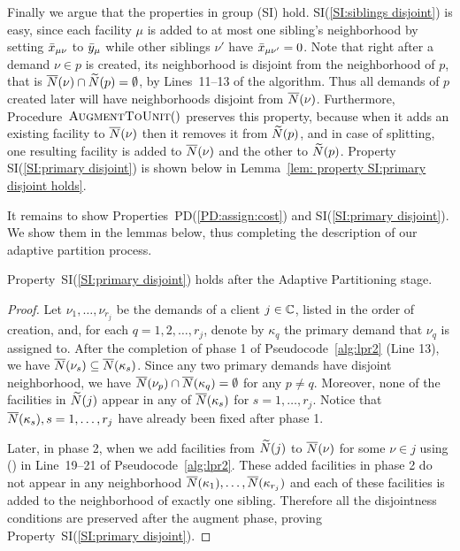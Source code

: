 \documentclass[11pt]{article}
\begin{document}
Finally we argue that the properties in group (SI)
hold. SI(\ref{SI:siblings disjoint}) is easy, since each
facility $\mu$ is added to at most one sibling's
neighborhood by setting ${\bar x}_{\mu\nu}$ to ${\bar y}_\mu$
while other siblings $\nu'$ have ${\bar x}_{\mu\nu'}=0$. Note
that right after a demand $\nu\in p$ is created, its
neighborhood is disjoint from the neighborhood of $p$, that
is ${\overline{N}}(\nu)\cap {\widetilde N}(p) = \emptyset$, by
Lines~11--13 of the algorithm. Thus all demands of $p$
created later will have neighborhoods disjoint from
${\overline{N}}(\nu)$. Furthermore, Procedure~${\textsc{AugmentToUnit}}()$
preserves this property, because when it adds an existing
facility to ${\overline{N}}(\nu)$ then it removes it from
${\widetilde N}(p)$, and in case of splitting, one resulting
facility is added to ${\overline{N}}(\nu)$ and the other to
${\widetilde N}(p)$. Property SI(\ref{SI:primary disjoint}) is shown
below in Lemma~\ref{lem: property SI:primary disjoint holds}.

It remains to show Properties~PD(\ref{PD:assign:cost}) and
SI(\ref{SI:primary disjoint}). We show them in the lemmas
below, thus completing the description of our adaptive
partition process.




\begin{lemma}\label{lem: property SI:primary disjoint holds}
  Property~SI(\ref{SI:primary disjoint}) holds after the
  Adaptive Partitioning stage.
\end{lemma}
\begin{proof}
  Let $\nu_1,\ldots,\nu_{r_j}$ be the demands of a client
  $j\in\mathbb{C}$, listed in the order of creation, and,
  for each $q=1,2,\ldots,r_j$, denote by $\kappa_q$ the
  primary demand that $\nu_q$ is assigned to. After the
  completion of phase 1 of Pseudocode~\ref{alg:lpr2} (Line
  13), we have ${\overline{N}}(\nu_s)\subseteq
  {\overline{N}}(\kappa_s)$. Since any two primary demands have
  disjoint neighborhood, we have ${\overline{N}}(\nu_p) \cap
  {\overline{N}}(\kappa_q) = \emptyset$ for any $p\neq q$. Moreover,
  none of the facilities in ${\widetilde N}(j)$ appear in any of
  ${\overline{N}}(\kappa_s)$ for $s=1,\ldots,r_j$. Notice that
  ${\overline{N}}(\kappa_s), s=1,\ldots,r_j$ have already been fixed
  after phase 1.

  Later, in phase 2, when we add facilities from
  ${\widetilde N}(j)$ to ${\overline{N}}(\nu)$ for some $\nu\in j$ using
  \AugmentToUnit() in Line~19--21 of
  Pseudocode~\ref{alg:lpr2}. These added facilities in phase
  2 do not appear in any neighborhood ${\overline{N}}(\kappa_1),
  \ldots, {\overline{N}}(\kappa_{r_j})$ and each of these facilities
  is added to the neighborhood of exactly one sibling.
  Therefore all the disjointness conditions are preserved
  after the augment phase, proving
  Property~SI(\ref{SI:primary disjoint}).
\end{proof}
\end{document}
